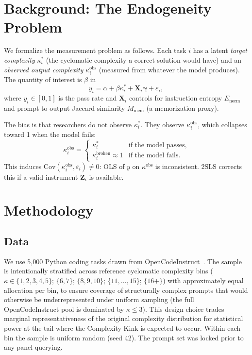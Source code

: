 \documentclass[conference]{IEEEtran}
\begin{document}
\section{Background: The Endogeneity Problem}

We formalize the measurement problem as follows. Each task $i$ has a latent \emph{target complexity} $\kappa_i^*$ (the cyclomatic complexity a correct solution would have) and an \emph{observed output complexity} $\kappa_i^{\text{obs}}$ (measured from whatever the model produces). The quantity of interest is $\beta$ in
\begin{equation}
y_i = \alpha + \beta \kappa_i^* + \mathbf{X}_i \boldsymbol{\gamma} + \varepsilon_i,
\label{eq:structural}
\end{equation}
where $y_i\in[0,1]$ is the pass rate and $\mathbf{X}_i$ controls for instruction entropy $E_{\text{norm}}$ and prompt to output Jaccard similarity $M_{\text{mem}}$ (a memorization proxy).

The bias is that researchers do not observe $\kappa_i^*$. They observe $\kappa_i^{\text{obs}}$, which collapses toward 1 when the model fails:
\begin{equation}
\kappa_i^{\text{obs}} =
\begin{cases}
\kappa_i^* & \text{if the model passes,}\\
\kappa_i^{\text{broken}}\approx 1 & \text{if the model fails.}
\end{cases}
\end{equation}
This induces $\mathrm{Cov}(\kappa_i^{\text{obs}},\varepsilon_i)\neq 0$: OLS of $y$ on $\kappa^{\text{obs}}$ is inconsistent. 2SLS corrects this if a valid instrument $\mathbf{Z}_i$ is available.

\section{Methodology}

\subsection{Data}
We use 5{,}000 Python coding tasks drawn from OpenCodeInstruct~\cite{opencodeinst}. The sample is intentionally stratified across reference cyclomatic complexity bins ($\kappa\in\{1,2,3,4,5\}$; $\{6,7\}$; $\{8,9,10\}$; $\{11,\ldots,15\}$; $\{16+\}$) with approximately equal allocation per bin, to ensure coverage of structurally complex prompts that would otherwise be underrepresented under uniform sampling (the full OpenCodeInstruct pool is dominated by $\kappa\leq 3$). This design choice trades marginal representativeness of the original complexity distribution for statistical power at the tail where the Complexity Kink is expected to occur. Within each bin the sample is uniform random (seed 42). The prompt set was locked prior to any panel querying.
\end{document}
